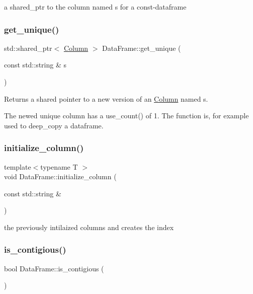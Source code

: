 a shared\+\_\+ptr to the column named s for a const-\/dataframe \mbox{\label{classDataFrame_a5909652f24e66c22922b4b4c910f2b09}} 
\subsubsection{\texorpdfstring{get\+\_\+unique()}{get\_unique()}}
{\footnotesize\ttfamily std\+::shared\+\_\+ptr$<$ \hyperlink{classColumn}{Column} $>$ Data\+Frame\+::get\+\_\+unique (\begin{DoxyParamCaption}\item[{const std\+::string \&}]{s }\end{DoxyParamCaption})}



Returns a shared pointer to a new version of an \hyperlink{classColumn}{Column} named s. 

The newed unique column has a use\+\_\+count() of 1. The function is, for example used to deep\+\_\+copy a dataframe. \mbox{\label{classDataFrame_a133bc6ff5a8d26e77deb65ec005f32a7}} 
\subsubsection{\texorpdfstring{initialize\+\_\+column()}{initialize\_column()}}
{\footnotesize\ttfamily template$<$typename T $>$ \\
void Data\+Frame\+::initialize\+\_\+column (\begin{DoxyParamCaption}\item[{const std\+::string \&}]{ }\end{DoxyParamCaption})\hspace{0.3cm}{\ttfamily [private]}}

the previously intilaized columns and creates the index \mbox{\label{classDataFrame_a40f6420c823601946d56ba625484a74e}} 
\subsubsection{\texorpdfstring{is\+\_\+contigious()}{is\_contigious()}}
{\footnotesize\ttfamily bool Data\+Frame\+::is\+\_\+contigious (\begin{DoxyParamCaption}{ }\end{DoxyParamCaption})}



